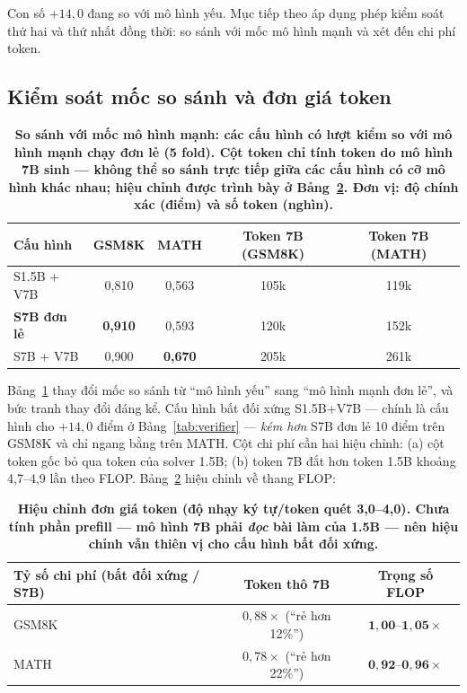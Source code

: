 \documentclass[12pt,a4paper]{article}
\begin{document}
Con số \(+14{,}0\) đang so với mô hình yếu. Mục tiếp theo áp dụng phép kiểm soát thứ hai và thứ nhất đồng thời: so sánh với mốc mô hình mạnh và xét đến chi phí token.

\subsection{Kiểm soát mốc so sánh và đơn giá token}\label{sec:baseline}

\begin{table}[h]\centering\small
\begin{tabular}{@{}l c c c c@{}}
\toprule
Cấu hình & GSM8K & MATH & Token 7B (GSM8K) & Token 7B (MATH)\\
\midrule
S1.5B + V7B & 0,810 & 0,563 & 105k & 119k\\
\textbf{S7B đơn lẻ} & \textbf{0,910} & 0,593 & 120k & 152k\\
S7B + V7B & 0,900 & \textbf{0,670} & 205k & 261k\\
\bottomrule
\end{tabular}
\caption{\textbf{So sánh với mốc mô hình mạnh: các cấu hình có lượt kiểm so với mô hình mạnh chạy đơn lẻ (5 fold). Cột token chỉ tính token do mô hình 7B sinh --- không thể so sánh trực tiếp giữa các cấu hình có cỡ mô hình khác nhau; hiệu chỉnh được trình bày ở Bảng~\ref{tab:flop}. Đơn vị: độ chính xác (điểm) và số token (nghìn).}}
\label{tab:baseline}
\end{table}

Bảng~\ref{tab:baseline} thay đổi mốc so sánh từ ``mô hình yếu'' sang ``mô hình mạnh đơn lẻ'', và bức tranh thay đổi đáng kể. Cấu hình bất đối xứng S1.5B+V7B --- chính là cấu hình cho \(+14{,}0\) điểm ở Bảng~\ref{tab:verifier} --- \textit{kém hơn} S7B đơn lẻ 10 điểm trên GSM8K và chỉ ngang bằng trên MATH. Cột chi phí cần hai hiệu chỉnh: (a) cột token gốc bỏ qua token của solver 1.5B; (b) token 7B đắt hơn token 1.5B khoảng 4,7--4,9 lần theo FLOP. Bảng~\ref{tab:flop} hiệu chỉnh về thang FLOP:

\begin{table}[h]\centering\small
\begin{tabular}{@{}l c c@{}}
\toprule
Tỷ số chi phí (bất đối xứng / S7B) & Token thô 7B & Trọng số FLOP\\
\midrule
GSM8K & \(0{,}88\times\) (``rẻ hơn 12\%'') & \(\mathbf{1{,}00\text{--}1{,}05\times}\) \\
MATH & \(0{,}78\times\) (``rẻ hơn 22\%'') & \(\mathbf{0{,}92\text{--}0{,}96\times}\) \\
\bottomrule
\end{tabular}
\caption{\textbf{Hiệu chỉnh đơn giá token (độ nhạy ký tự/token quét 3,0--4,0). Chưa tính phần prefill --- mô hình 7B phải \textit{đọc} bài làm của 1.5B --- nên hiệu chỉnh vẫn thiên vị cho cấu hình bất đối xứng.}}
\label{tab:flop}
\end{table}
\end{document}
